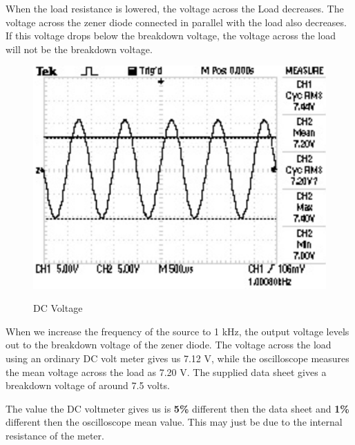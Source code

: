 \documentclass[twocolumn,english]{IEEEtran}
\begin{document}
When the load resistance is lowered, the voltage across the Load decreases. The voltage across the zener diode connected in parallel with the load also decreases. If this voltage drops below the breakdown voltage, the voltage across the load will not be the breakdown voltage.

\begin{figure}[h!]
  \begin{centering}
  \begin{center}
  \includegraphics[width=\linewidth]{./dcp.png}
  \label{fig:dcp}
  \caption{DC Voltage}
  \end{center}
  \par\end{centering}
  \end{figure}

When we increase the frequency of the source to 1 kHz, the output voltage levels out to the breakdown voltage of the zener diode. The voltage across the load using an ordinary DC volt meter gives us 7.12 V, while the oscilloscope measures the mean voltage across the load as 7.20 V. The supplied data sheet gives a breakdown voltage of around 7.5 volts.

The value the DC voltmeter gives us is \textbf{5\%} different then the data sheet and \textbf{1\%} different then the oscilloscope mean value. This may just be due to the internal resistance of the meter.
\end{document}
